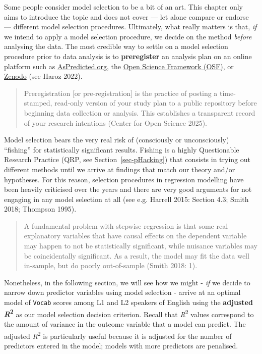 \documentclass[
  letterpaper,
  DIV=11,
  numbers=noendperiod]{scrreprt}
\begin{document}
Some people consider model selection to be a bit of an art. This chapter
only aims to introduce the topic and does not cover --- let alone
compare or endorse --- different model selection procedures. Ultimately,
what really matters is that, \emph{if} we intend to apply a model
selection procedure, we decide on the method \emph{before} analysing the
data. The most credible way to settle on a model selection procedure
prior to data analysis is to \textbf{preregister} an analysis plan on an
online platform such as
\href{https://aspredicted.org/}{AsPredicted.org}, the
\href{https://www.cos.io/initiatives/prereg}{Open Science Framework
(OSF)}, or \href{https://zenodo.org/}{Zenodo} (see Haroz 2022).

\begin{quote}
Preregistration {[}or pre-registration{]} is the practice of posting a
time-stamped, read-only version of your study plan to a public
repository before beginning data collection or analysis. This
establishes a transparent record of your research intentions (Center for
Open Science 2025).
\end{quote}

Model selection bears the very real risk of (consciously or
unconsciously) ``fishing'' for statistically significant results.
Fishing is a highly Questionable Research Practice (QRP, see
Section~\ref{sec-pHacking}) that consists in trying out different
methods until we arrive at findings that match our theory and/or
hypotheses. For this reason, selection procedures in regression
modelling have been heavily criticised over the years and there are very
good arguments for not engaging in any model selection at all (see e.g.
Harrell 2015: Section 4.3; Smith 2018; Thompson 1995).

\begin{quote}
A fundamental problem with stepwise regression is that some real
explanatory variables that have causal effects on the dependent variable
may happen to not be statistically significant, while nuisance variables
may be coincidentally significant. As a result, the model may fit the
data well in-sample, but do poorly out-of-sample (Smith 2018: 1).
\end{quote}

Nonetheless, in the following section, we will see how we might -
\emph{if} we decide to narrow down predictor variables using model
selection - arrive at an optimal model of \texttt{Vocab} scores among L1
and L2 speakers of English using the \textbf{adjusted
\emph{R}\textsuperscript{2}} as our model selection decision criterion.
Recall that \emph{R}\textsuperscript{2} values correspond to the amount
of variance in the outcome variable that a model can predict. The
adjusted \emph{R}\textsuperscript{2} is particularly useful because it
is adjusted for the number of predictors entered in the model; models
with more predictors are penalised.
\end{document}
